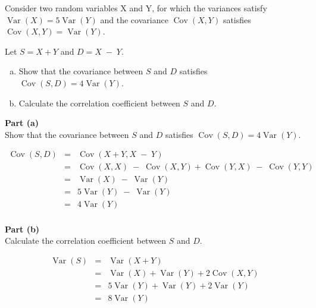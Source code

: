 \documentclass[a4paper,12pt]{article}
\begin{document}
\large \noindent Consider two random variables X and Y, for which the variances satisfy $\operatorname{Var}(X) = 5\operatorname{Var}(Y)$
and the covariance $\operatorname{Cov}(X,Y)$ satisfies $\operatorname{Cov}(X,Y) = \operatorname{Var}(Y)$.

\medskip
\noindent 
Let $S = X + Y$ and $D = X \;-\; Y$.
\begin{enumerate}[(a)]
\item Show that the covariance between $S$ and $D$ satisfies $\operatorname{Cov}(S,D) = 4\operatorname{Var}(Y)$.
\item  Calculate the correlation coefficient between $S$ and $D$.
\end{enumerate}

\newpage
\begin{framed}
\noindent \textbf{Part (a)} \\
\large
\noindent Show that the covariance between $S$ and $D$ satisfies $\operatorname{Cov}(S,D) = 4\operatorname{Var}(Y)$.
\end{framed}
\begin{eqnarray*}
\operatorname{Cov}(S,D) &=& \operatorname{Cov}(X + Y , X \;-\; Y) \\ 
&=& \operatorname{Cov}(X,X) \;-\; \operatorname{Cov}(X,Y) + \operatorname{Cov}(Y,X) \;-\; \operatorname{Cov}(Y,Y)\\
&=& \operatorname{Var}(X) \;-\; \operatorname{Var}(Y) \\ 
&=& 5\operatorname{Var}(Y)\;-\; \operatorname{Var}(Y) \\ 
&=& 4\operatorname{Var}(Y)\\
\end{eqnarray*}
\newpage

\begin{framed}\noindent \textbf{Part (b)} \\
\large
 Calculate the correlation coefficient between $S$ and $D$.
\end{framed}

\begin{eqnarray*}
\operatorname{Var}(S) &=& \operatorname{Var}(X + Y)\\
&=& \operatorname{Var}(X) + \operatorname{Var}(Y) + 2\operatorname{Cov}(X,Y) \\
&=& 5\operatorname{Var}(Y) + \operatorname{Var}(Y) + 2\operatorname{Var}(Y) \\
&=& 8 \operatorname{Var}(Y)\\
\end{eqnarray*}
\end{document}
